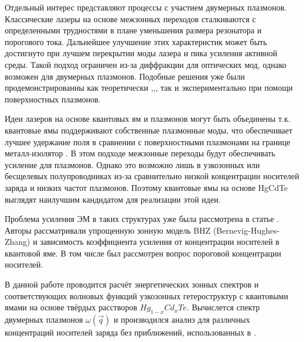 \documentclass[../main.tex]{subfiles}
\begin{document}
Отдельный интерес представляют процессы с участием двумерных плазмонов. Классические лазеры на основе межзонных переходов сталкиваются с определенными трудностями
в плане уменьшения размера резонатора и порогового тока. Дальнейшее улучшение этих характеристик может быть достигнуто при лучшем перекрытии моды лазера
и пика усиления активной среды. Такой подход ограничен из-за диффракции для оптических мод, однако возможен для двумерных плазмонов. Подобные решения
уже были продемонстрированны как теоретически \cite{bergman2003surface},\cite{berini2012surface},\cite{oulton2009plasmon}, так и экспериментально 
\cite{khurgin2012practicality} при помощи поверхностных плазмонов.

Идеи лазеров на основе квантовых ям и плазмонов могут быть объединены \cite{kapralov2019feasibility} т.к. квантовые ямы поддерживают собственные 
плазмонные моды, что обеспечивает лучшее удержание поля в сравнении с поверхностными плазмонами на границе металл-изолятор \cite{stern1967polarizability}.
В этом подходе межзонные переходы будут обеспечивать усиление для плазмонов. Однако это возможно лишь в узкозонных или бесщелевых полупроводниках
из-за сравнительно низкой концентрации носителей заряда и низких частот плазмонов. Поэтому квантовые ямы на основе HgCdTe выглядят наилучшим кандидатом
для реализации этой идеи.

Проблема усиления ЭМ в таких структурах уже была рассмотрена в статье \cite{kapralov2019feasibility}. Авторы рассматривали упрощенную зонную модель
BHZ (Bernevig-Hughes-Zhang) \cite{bernevig2006quantum} и зависимость коэффициента усиления от концентрации носителей в квантовой яме. В том
числе был рассмотрен вопрос пороговой концентрации носителей.

В данной работе проводится расчёт энергетических зонных спектров и соответствующих волновых функций узкозонных гетероструктур с квантовыми
ямами на основе твёрдых расстворов $Hg_{1-x}Cd_{x}Te$. Вычислется спектр двумерных плазмонов $\omega(\vec q)$ и производился
анализ для различных концентраций носителей заряда без приближений, использованных в \cite{kapralov2019feasibility}.
\end{document}
